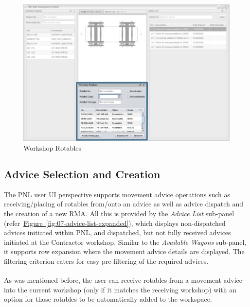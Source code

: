 \begin{figure}[!h]
\centering
\includegraphics[scale=0.37]{chapters/01-user-interface/images/05-rotables-in-workshop-sorted-by-class-with-autocompleter.png}
\caption{Workshop Rotables}\label{fig:05-rotables-in-workshop-sorted-by-class-with-autocompleter}
\end{figure}

\clearpage

\subsection{Advice Selection and Creation}

The PNL user UI perspective supports movement advice operations such as receiving/placing of rotables from/onto an advice as well as advice dispatch and the creation of a new RMA. All this is provided by the \emph{Advice List} sub-panel (refer~\hyperref[fig:07-advice-list-expanded]{Figure~\ref*{fig:07-advice-list-expanded}}), which displays non-dispatched advices initiated within PNL, and dispatched, but not fully received advices initiated at the Contractor workshop. Similar to the \emph{Available Wagons} sub-panel, it supports row expansion where the movement advice details are displayed. The filtering criterion caters for easy pre-filtering of the required advices.
\\\\
As was mentioned before, the user can receive rotables from a movement advice into the current workshop (only if it matches the receiving workshop) with an option for those rotables to be automatically added to the workspace.

